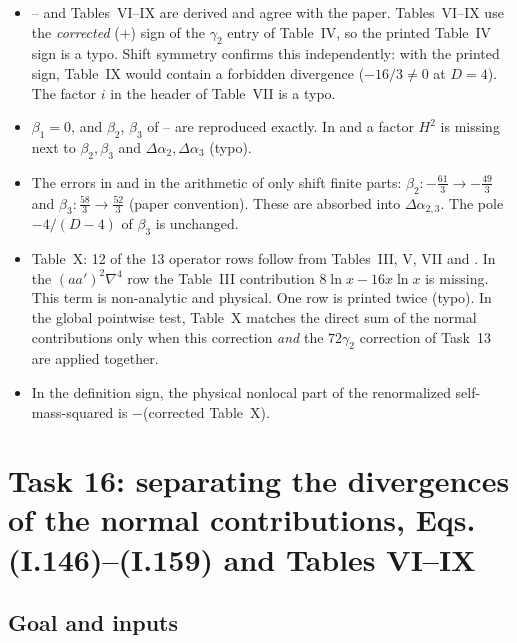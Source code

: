 \begin{resultbox}
\begin{itemize}[leftmargin=*,itemsep=1pt]
\item {}-- and Tables~VI--IX are derived and agree with the paper.
Tables~VI--IX use the \emph{corrected} ($+$) sign of the $\gamma_2$ entry of Table~IV, so the printed Table~IV sign is a typo.
Shift symmetry confirms this independently: with the printed sign, Table~IX would contain a forbidden divergence ($-16/3\neq0$ at $D=4$).
The factor $i$ in the header of Table~VII is a typo.
\item $\beta_1=0$, and $\beta_2$, $\beta_3$ of -- are reproduced exactly. In  and  a factor $H^2$ is missing next to $\beta_2,\beta_3$ and $\Delta\alpha_2,\Delta\alpha_3$ (typo).
\item The errors in  and in the arithmetic of  only shift finite parts: $\beta_2:-\tfrac{61}{3}\to-\tfrac{49}{3}$ and $\beta_3:\tfrac{58}{3}\to\tfrac{52}{3}$ (paper convention).
These are absorbed into $\Delta\alpha_{2,3}$. The pole $-4/(D-4)$ of $\beta_3$ is unchanged.
\item Table~X: 12 of the 13 operator rows follow from Tables~III, V, VII and .
In the $(aa')^2\nabla^4$ row the Table~III contribution $8\ln x-16x\ln x$ is missing. This term is non-analytic and physical.
One row is printed twice (typo). In the global pointwise test, Table~X matches the direct sum of the normal contributions only when this correction \emph{and} the $72\gamma_2$ correction of Task~13 are applied together.
\item In the definition sign, the physical nonlocal part of the renormalized self-mass-squared is $-$(corrected Table~X).
\end{itemize}
\end{resultbox}

\section{Task 16: separating the divergences of the normal contributions, Eqs. (I.146)--(I.159) and Tables VI--IX}
\label{sec:ch08-t16}

\subsection{Goal and inputs}

